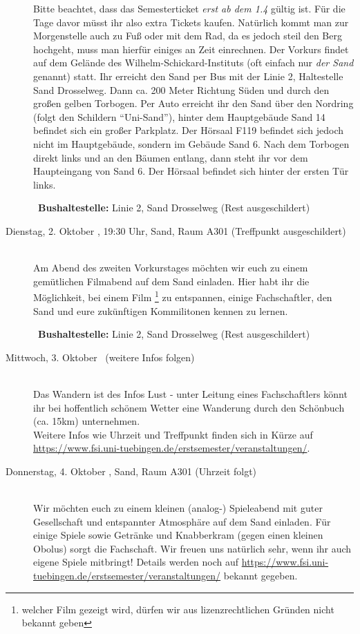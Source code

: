 \begin{description}
\ifsommersemester
Bitte beachtet, dass das Semesterticket \emph{erst ab dem 1.4} gültig ist. Für die Tage davor müsst ihr also extra Tickets kaufen. Natürlich kommt man zur Morgenstelle auch zu Fuß oder mit dem Rad, da es jedoch steil den Berg hochgeht, muss man hierfür einiges an Zeit einrechnen.
\fi
Der Vorkurs findet auf dem Gelände des Wilhelm-Schickard-Instituts (oft einfach nur \emph{der Sand} genannt) statt. Ihr erreicht den Sand per Bus mit der Linie 2, Haltestelle Sand Drosselweg. Dann ca. 200 Meter Richtung Süden und durch den großen gelben Torbogen. Per Auto erreicht ihr den Sand über den Nordring (folgt den Schildern "`Uni-Sand"'), hinter dem Hauptgebäude Sand 14 befindet sich ein großer Parkplatz. Der Hörsaal F119 befindet sich jedoch nicht im Hauptgebäude, sondern im Gebäude Sand 6. Nach dem Torbogen direkt links und an den Bäumen entlang, dann steht ihr vor dem Haupteingang von Sand 6. Der Hörsaal befindet sich hinter der ersten Tür links.

~\textbf{Bushaltestelle:} Linie 2, Sand Drosselweg (Rest ausgeschildert)
\fi 

\item[Dienstag, 2. Oktober \Jahr, 19:30 Uhr, Sand, Raum A301 (Treffpunkt ausgeschildert)]\ \\
Am Abend des zweiten Vorkurstages möchten wir euch zu einem gemütlichen Filmabend auf dem Sand einladen.
Hier habt ihr die Möglichkeit, bei einem Film \footnote{welcher Film gezeigt wird, dürfen wir aus lizenzrechtlichen Gründen nicht bekannt geben} zu entspannen, einige Fachschaftler, den Sand und eure zukünftigen Kommilitonen kennen zu lernen.

~\textbf{Bushaltestelle:} Linie 2, Sand Drosselweg (Rest ausgeschildert)

\item[Mittwoch, 3. Oktober \Jahr~(weitere Infos folgen)]\ \\
Das Wandern ist des Infos Lust - unter Leitung eines Fachschaftlers könnt ihr bei hoffentlich schönem Wetter eine Wanderung durch den Schönbuch (ca. 15km) unternehmen. \\
Weitere Infos wie Uhrzeit und Treffpunkt finden sich in Kürze auf \url{https://www.fsi.uni-tuebingen.de/erstsemester/veranstaltungen/}.

\item[Donnerstag, 4. Oktober \Jahr, Sand, Raum A301 (Uhrzeit folgt)]\ \\
Wir möchten euch zu einem kleinen (analog-) Spieleabend mit guter Gesellschaft und entspannter Atmosphäre auf dem Sand einladen. Für einige Spiele sowie Getränke und Knabberkram (gegen einen kleinen Obolus) sorgt die Fachschaft. Wir freuen uns natürlich sehr, wenn ihr auch eigene Spiele mitbringt! Details werden noch auf \url{https://www.fsi.uni-tuebingen.de/erstsemester/veranstaltungen/} bekannt gegeben.


\end{description}
